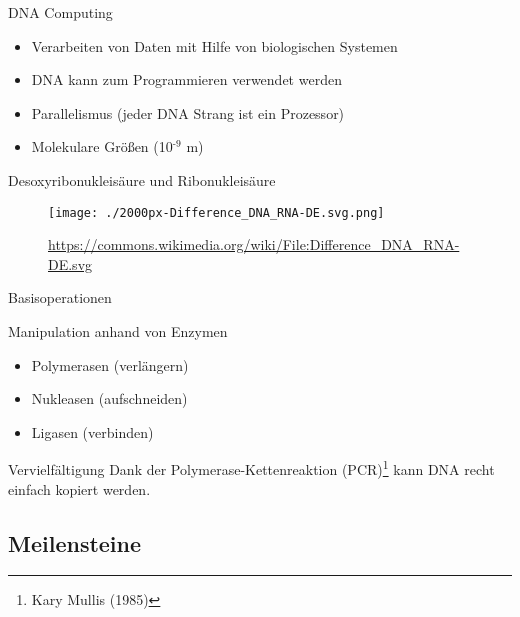 \documentclass[aspectratio=1610]{beamer}
\begin{document}
\begin{frame}[label={sec:org62fba69}]{DNA Computing}
\begin{itemize}
\item Verarbeiten von Daten mit Hilfe von biologischen Systemen
\item DNA kann zum Programmieren verwendet werden
\item Parallelismus (jeder DNA Strang ist ein Prozessor)
\item Molekulare Größen (10\(^{\text{-9}}\) m)
\end{itemize}
\end{frame}

\begin{frame}[label={sec:orgb74b855}]{Desoxyribonukleisäure und Ribonukleisäure}
\begin{figure}[htbp]
\centering
\texttt{[image: ./2000px-Difference\_DNA\_RNA-DE.svg.png]}
\caption{\url{https://commons.wikimedia.org/wiki/File:Difference\_DNA\_RNA-DE.svg}}
\end{figure}
\end{frame}

\begin{frame}[label={sec:orgbc9ec26}]{Basisoperationen}
\begin{block}{Manipulation anhand von Enzymen}
\begin{itemize}
\item Polymerasen (verlängern)
\item Nukleasen (aufschneiden)
\item Ligasen (verbinden)
\end{itemize}
\end{block}

\begin{block}{Vervielfältigung}
Dank der Polymerase-Kettenreaktion (PCR)\footnote{Kary Mullis (1985)} kann DNA recht einfach kopiert werden.
\end{block}
\end{frame}

\subsection{Meilensteine}
\label{sec:orgcab4414}
\end{document}
